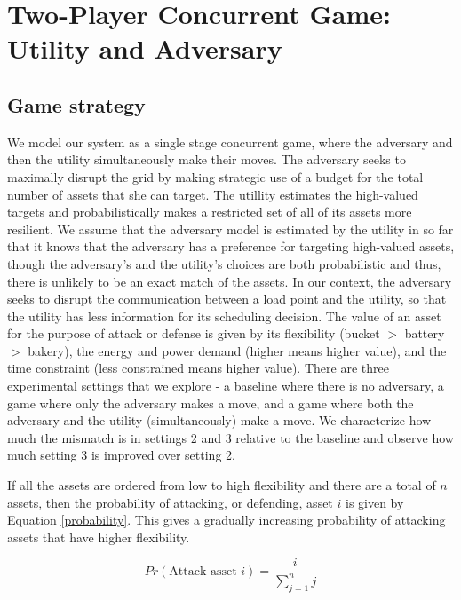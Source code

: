\documentclass[conference]{IEEEtran}
\begin{document}
\section{Two-Player Concurrent Game: Utility and Adversary}
\label{Game}

\subsection{Game strategy}

We model our system as a single stage concurrent game, where the adversary and then the utility simultaneously make their moves. The adversary seeks to maximally disrupt the grid by making strategic use of a budget for the total number of assets that she can target. The utillity estimates the high-valued targets and probabilistically makes a restricted set of all of its assets more resilient. We assume that the adversary model is estimated by the utility in so far that it knows that the adversary has a preference for targeting high-valued assets, though the adversary's and the utility's choices are both probabilistic and thus, there is unlikely to be an exact match of the assets. In our context, the adversary seeks to disrupt the communication between a load point and the utility, so that the utility has less information for its scheduling decision. The value of an asset for the purpose of attack or defense is given by its flexibility (bucket $>$ battery $>$ bakery), the energy and power demand (higher means higher value), and the time constraint (less constrained means higher value).  
There are three experimental settings that we explore - a baseline where there is no adversary, a game where only the adversary makes a move, and a game where both the adversary and the utility (simultaneously) make a move. We characterize how much the mismatch is in settings 2 and 3 relative to the baseline and observe how much setting 3 is improved over setting 2. 

If all the assets are ordered from low to high flexibility and there are a total of $n$ assets, then the probability of attacking, or defending, asset $i$ is given by Equation \ref{probability}. This gives a gradually increasing probability of attacking assets that have higher flexibility. 

\begin{equation}
\label{probability}
Pr(\text{Attack asset } i) = \frac{i}{\sum\limits_{j=1}^n j}
\end{equation}
\end{document}
